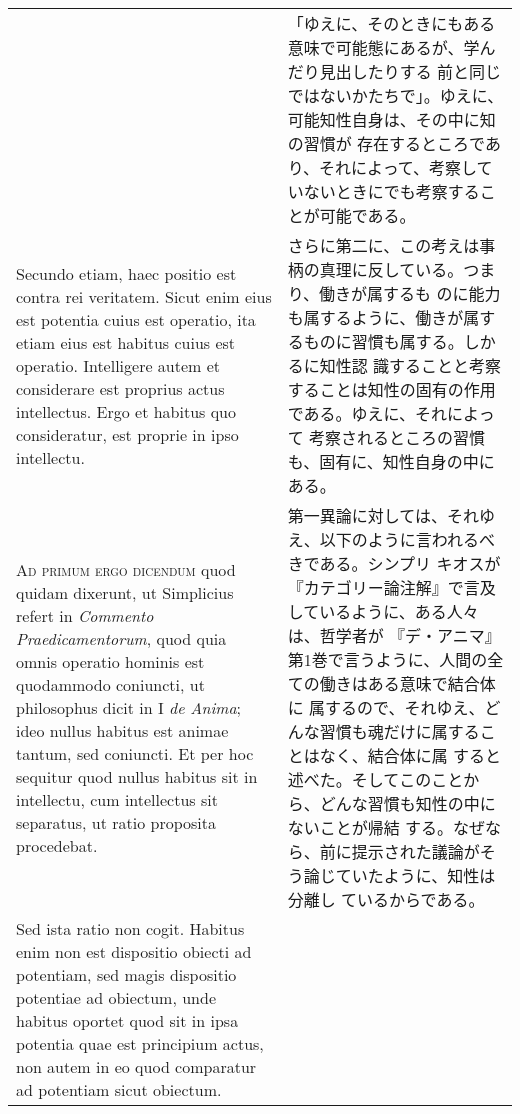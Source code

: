 \documentclass[10pt]{jsarticle} %
\begin{document}
\begin{longtable}{p{21em}p{21em}}
&

「ゆえに、そのときにもある意味で可能態にあるが、学んだり見出したりする
前と同じではないかたちで」。ゆえに、可能知性自身は、その中に知の習慣が
存在するところであり、それによって、考察していないときにでも考察するこ
とが可能である。

\\

Secundo etiam, haec positio est contra rei veritatem. Sicut enim eius
est potentia cuius est operatio, ita etiam eius est habitus cuius est
operatio. Intelligere autem et considerare est proprius actus
intellectus. Ergo et habitus quo consideratur, est proprie in ipso
intellectu.

&

さらに第二に、この考えは事柄の真理に反している。つまり、働きが属するも
のに能力も属するように、働きが属するものに習慣も属する。しかるに知性認
識することと考察することは知性の固有の作用である。ゆえに、それによって
考察されるところの習慣も、固有に、知性自身の中にある。

\\




{\scshape Ad primum ergo dicendum} quod quidam dixerunt, ut Simplicius refert in
 {\itshape Commento Praedicamentorum}, quod quia omnis operatio hominis est
 quodammodo coniuncti, ut philosophus dicit in I {\itshape de Anima}; ideo nullus
 habitus est animae tantum, sed coniuncti. Et per hoc sequitur quod
 nullus habitus sit in intellectu, cum intellectus sit separatus, ut
 ratio proposita procedebat. 

&

第一異論に対しては、それゆえ、以下のように言われるべきである。シンプリ
キオスが『カテゴリー論注解』で言及しているように、ある人々は、哲学者が
『デ・アニマ』第1巻で言うように、人間の全ての働きはある意味で結合体に
属するので、それゆえ、どんな習慣も魂だけに属することはなく、結合体に属
すると述べた。そしてこのことから、どんな習慣も知性の中にないことが帰結
する。なぜなら、前に提示された議論がそう論じていたように、知性は分離し
ているからである。


\\

Sed ista ratio non cogit. Habitus enim non est dispositio obiecti ad
potentiam, sed magis dispositio potentiae ad obiectum, unde habitus
oportet quod sit in ipsa potentia quae est principium actus, non autem
in eo quod comparatur ad potentiam sicut obiectum.

&


\end{longtable}
\end{document}
